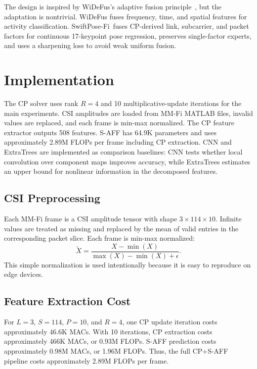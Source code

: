\documentclass[10pt,conference]{IEEEtran}
\newcommand{\method}{SwiftPose-Fi}
\begin{document}
The design is inspired by WiDeFus's adaptive fusion principle~\cite{widefus2026}, but the adaptation is nontrivial. WiDeFus fuses frequency, time, and spatial features for activity classification. \method\ fuses CP-derived link, subcarrier, and packet factors for continuous 17-keypoint pose regression, preserves single-factor experts, and uses a sharpening loss to avoid weak uniform fusion.

\section{Implementation}

The CP solver uses rank $R=4$ and 10 multiplicative-update iterations for the main experiments. CSI amplitudes are loaded from MM-Fi MATLAB files, invalid values are replaced, and each frame is min-max normalized. The CP feature extractor outputs 508 features. S-AFF has 64.9K parameters and uses approximately 2.89M FLOPs per frame including CP extraction. CNN and ExtraTrees are implemented as comparison baselines: CNN tests whether local convolution over component maps improves accuracy, while ExtraTrees estimates an upper bound for nonlinear information in the decomposed features.

\subsection{CSI Preprocessing}

Each MM-Fi frame is a CSI amplitude tensor with shape $3\times114\times10$. Infinite values are treated as missing and replaced by the mean of valid entries in the corresponding packet slice. Each frame is min-max normalized:
\begin{equation}
\tilde{X}=\frac{X-\min(X)}{\max(X)-\min(X)+\epsilon}.
\end{equation}
This simple normalization is used intentionally because it is easy to reproduce on edge devices.

\subsection{Feature Extraction Cost}

For $L=3$, $S=114$, $P=10$, and $R=4$, one CP update iteration costs approximately 46.6K MACs. With 10 iterations, CP extraction costs approximately 466K MACs, or 0.93M FLOPs. S-AFF prediction costs approximately 0.98M MACs, or 1.96M FLOPs. Thus, the full CP+S-AFF pipeline costs approximately 2.89M FLOPs per frame.
\end{document}

